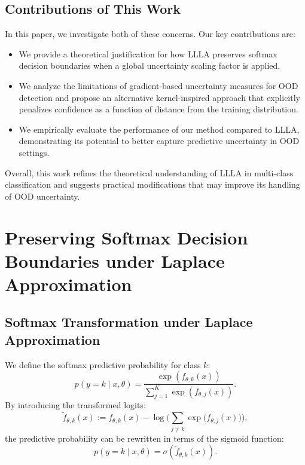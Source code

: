 \documentclass{article}
\begin{document}
\subsection{Contributions of This Work}

In this paper, we investigate both of these concerns. Our key contributions are:
\begin{itemize}
    \item We provide a theoretical justification for how LLLA preserves softmax decision boundaries when a global uncertainty scaling factor is applied.
    \item We analyze the limitations of gradient-based uncertainty measures for OOD detection and propose an alternative kernel-inspired approach that explicitly penalizes confidence as a function of distance from the training distribution.
    \item We empirically evaluate the performance of our method compared to LLLA, demonstrating its potential to better capture predictive uncertainty in OOD settings.
\end{itemize}

Overall, this work refines the theoretical understanding of LLLA in multi-class classification and suggests practical modifications that may improve its handling of OOD uncertainty.


\section{Preserving Softmax Decision Boundaries under Laplace Approximation}

\subsection{Softmax Transformation under Laplace Approximation}
We define the softmax predictive probability for class \( k \):
\begin{equation}
p(y = k \mid x, \theta) = \frac{\exp(f_{\theta,k}(x))}{\sum_{j=1}^K \exp(f_{\theta,j}(x))}.
\end{equation}
By introducing the transformed logits:
\begin{equation}
\tilde{f}_{\theta,k}(x) := f_{\theta,k}(x) - \log\Biggl(\sum_{j\neq k} \exp\bigl(f_{\theta,j}(x)\bigr)\Biggr),
\end{equation}
the predictive probability can be rewritten in terms of the sigmoid function:
\begin{equation}
p(y = k \mid x, \theta) = \sigma(\tilde{f}_{\theta,k}(x)).
\end{equation}
\end{document}
